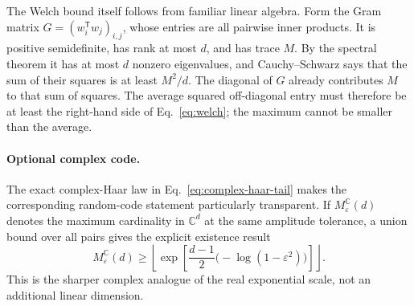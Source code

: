 \documentclass[
  aps,
  reprint,
  superscriptaddress,
  floatfix,
  nofootinbib,
  longbibliography
]{revtex4-2}
\newcommand{\Msem}{M}
\newcommand{\T}{^{\mathsf{T}}}
\begin{document}
The Welch bound itself follows from familiar linear algebra.  Form the Gram
matrix $G=(w_i\T w_j)_{i,j}$, whose entries are all pairwise inner products.  It is
positive semidefinite, has rank at most $d$, and has trace $\Msem$.  By the
spectral theorem it has at most $d$ nonzero eigenvalues, and Cauchy--Schwarz
says that the sum of their squares is at least $\Msem^2/d$.  The diagonal of
$G$ already contributes $\Msem$ to that sum of squares.  The average squared
off-diagonal entry must therefore be at least the right-hand side of
Eq.~\eqref{eq:welch}; the maximum cannot be smaller than the average.

\paragraph{Optional complex code.}
The exact complex-Haar law in Eq.~\eqref{eq:complex-haar-tail} makes the
corresponding random-code statement particularly transparent.  If
$M_\varepsilon^{\mathbb C}(d)$ denotes the maximum cardinality in
$\mathbb C^d$ at the same amplitude tolerance, a union bound over all pairs
gives the explicit existence result
\begin{equation}
\label{eq:complex-code}
M_\varepsilon^{\mathbb C}(d)
\geq
\left\lfloor
\exp\!\left[
\frac{d-1}{2}\bigl(-\log(1-\varepsilon^2)\bigr)
\right]
\right\rfloor .
\end{equation}
This is the sharper complex analogue of the real exponential scale, not an
additional linear dimension.
\end{document}
